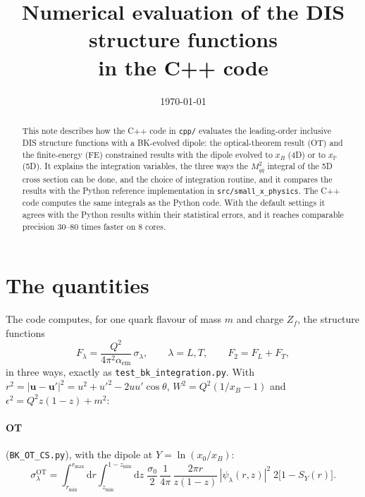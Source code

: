 \documentclass[11pt,a4paper]{article}
\title{Numerical evaluation of the DIS structure functions\\in the C++ code}
\author{}
\date{\today}
\newcommand{\Mqq}{M_{q\bar q}^2}
\newcommand{\dd}{\mathrm{d}}
\newcommand{\xP}{x_{\mathbb{P}}}
\newcommand{\code}[1]{\texttt{#1}}
\begin{document}
\maketitle

\begin{abstract}
  This note describes how the C++ code in \code{cpp/} evaluates the
  leading-order inclusive DIS structure functions with a BK-evolved dipole: the
  optical-theorem result (OT) and the finite-energy (FE) constrained results
  with the dipole evolved to $x_B$ (4D) or to $\xP$ (5D). It explains the
  integration variables, the three ways the $\Mqq$ integral of the 5D cross
  section can be done, and the choice of integration routine, and it compares
  the results with the Python reference implementation in
  \code{src/small\_x\_physics}. The C++ code computes the same integrals as
  the Python code. With the default settings it agrees with the Python results
  within their statistical errors, and it reaches comparable precision 30--80
  times faster on 8 cores.
\end{abstract}

\tableofcontents

\section{The quantities}
\label{sec:quantities}

The code computes, for one quark flavour of mass $m$ and charge $Z_f$, the
structure functions
\begin{equation}
  F_\lambda = \frac{Q^2}{4\pi^2 \alpha_{\text{em}}} \, \sigma_\lambda ,
  \qquad \lambda = L, T, \qquad F_2 = F_L + F_T ,
\end{equation}
in three ways, exactly as \code{test\_bk\_integration.py}. With
$r^2 = |\mathbf{u} - \mathbf{u}'|^2 = u^2 + u'^2 - 2uu'\cos\theta$,
$W^2 = Q^2(1/x_B - 1)$ and $\epsilon^2 = Q^2 z(1-z) + m^2$:

\paragraph{OT} (\code{BK\_OT\_CS.py}), with the dipole at $Y = \ln(x_0/x_B)$:
\begin{equation}
  \sigma_\lambda^{\text{OT}} = \int_{r_{\min}}^{r_{\max}} \dd r
    \int_{z_{\min}}^{1 - z_{\min}} \dd z \;
    \frac{\sigma_0}{2} \, \frac{1}{4\pi} \, \frac{2\pi r}{z(1-z)} \,
    |\psi_\lambda(r, z)|^2 \; 2\big[1 - S_Y(r)\big] .
\end{equation}
\end{document}
